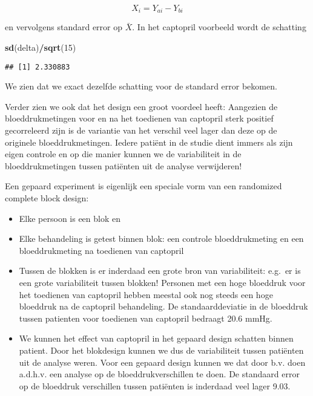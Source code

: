 \documentclass[
  12pt,dutch,coursenotes]{book}
\newenvironment{Shaded}{\begin{snugshade}}{\end{snugshade}}
\newcommand{\DecValTok}[1]{\textcolor[rgb]{0.00,0.00,0.81}{#1}}
\newcommand{\KeywordTok}[1]{\textcolor[rgb]{0.13,0.29,0.53}{\textbf{#1}}}
\newcommand{\NormalTok}[1]{#1}
\newcommand{\OperatorTok}[1]{\textcolor[rgb]{0.81,0.36,0.00}{\textbf{#1}}}
\theoremstyle{definition}
\theoremstyle{definition}
\theoremstyle{definition}
\theoremstyle{remark}
\begin{document}
\[X_{i}=Y_{ai}-Y_{bi}\]

en vervolgens standard error op \(\bar X\).
In het captopril voorbeeld wordt de schatting

\begin{Shaded}
\begin{Highlighting}[]
\KeywordTok{sd}\NormalTok{(delta)}\OperatorTok{/}\KeywordTok{sqrt}\NormalTok{(}\DecValTok{15}\NormalTok{)}
\end{Highlighting}
\end{Shaded}

\begin{verbatim}
## [1] 2.330883
\end{verbatim}

We zien dat we exact dezelfde schatting voor de standard error bekomen.

Verder zien we ook dat het design een groot voordeel heeft:
Aangezien de bloeddrukmetingen voor en na het toedienen van captopril sterk positief gecorreleerd zijn is de variantie van het verschil veel lager dan deze op de originele bloeddrukmetingen.
Iedere patiënt in de studie dient immers als zijn eigen controle en op die manier kunnen we de variabiliteit in de bloeddrukmetingen tussen patiënten uit de analyse verwijderen!

Een gepaard experiment is eigenlijk een speciale vorm van een randomized complete block design:

\begin{itemize}
\item
  Elke persoon is een blok en
\item
  Elke behandeling is getest binnen blok: een controle bloeddrukmeting en een bloeddrukmeting na toedienen van captopril
\item
  Tussen de blokken is er inderdaad een grote bron van variabiliteit: e.g.~er is een grote variabiliteit tussen blokken! Personen met een hoge bloeddruk voor het toedienen van captopril hebben meestal ook nog steeds een hoge bloeddruk na de captopril behandeling. De standaarddeviatie in de bloeddruk tussen patienten voor toedienen van captopril bedraagt 20.6 mmHg.
\item
  We kunnen het effect van captopril in het gepaard design schatten binnen patient. Door het blokdesign kunnen we dus de variabiliteit tussen patiënten uit de analyse weren. Voor een gepaard design kunnen we dat door b.v. doen a.d.h.v. een analyse op de bloeddrukverschillen te doen. De standaard error op de bloeddruk verschillen tussen patiënten is inderdaad veel lager 9.03.
\end{itemize}
\end{document}
